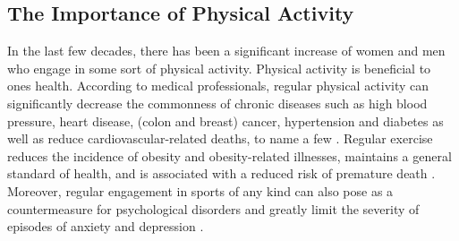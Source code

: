 \subsection{The Importance of Physical Activity}
In the last few decades, there has been a significant increase of women and men who engage in some sort of physical activity. Physical activity is beneficial to ones health. According to medical professionals, regular physical activity can significantly decrease the commonness of chronic diseases such as high blood pressure, heart disease,
(colon and breast) cancer, hypertension and diabetes as well as reduce cardiovascular-related deaths, to name a few \cite{mayr2015prevention, warburton2006health}. Regular exercise reduces the incidence of obesity
and obesity-related illnesses, maintains a general standard of health, and is associated with a reduced risk of premature death \cite{warburton2006health}. Moreover, regular engagement in sports of any kind can also pose as a countermeasure for psychological disorders and greatly limit the severity of
episodes of anxiety and depression \cite{mayr2015prevention}.
